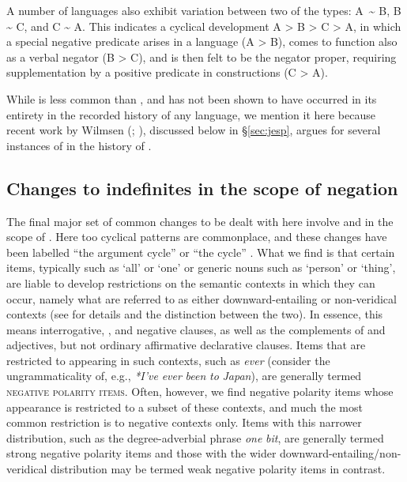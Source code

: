 \documentclass[output=paper]{langsci/langscibook}
\begin{document}
A number of languages also exhibit variation between two of the types: A~{\textasciitilde} B, B {\textasciitilde} C, and C {\textasciitilde} A. This indicates a cyclical development A > B > C > A, in which a special negative  predicate arises in a language (A > B), comes to function also as a verbal negator (B > C), and is then felt to be the negator proper, requiring supplementation by a positive  predicate in  constructions (C > A).

While  is less common than , and has not been shown to have occurred in its entirety in the recorded history of any language, we mention it here because recent work by Wilmsen (\citeyear[174–176]{Wilmsen2014}; \citeyear{Wilmsen2016}), discussed below in §\ref{sec:jesp}, argues for several instances of  in the history of .



\subsection{Changes to indefinites in the scope of negation}\label{sec:ind}\largerpage


The final major set of common changes to be dealt with here involve  and  in the scope of . Here too cyclical patterns are commonplace, and these changes have been labelled “the argument cycle” \citep{Ladusaw1993} or “the  cycle” \citep{Willis2011}. What we find is that certain items, typically  such as ‘all’ or ‘one’ or generic nouns such as ‘person’ or ‘thing’, are liable to develop restrictions on the semantic contexts in which they can occur, namely what are referred to as either downward-entailing or non-veridical contexts (see \citealt{Giannakidou1998} for details and the distinction between the two). In essence, this means interrogative, , and negative clauses, as well as the complements of  and  adjectives, but not ordinary affirmative declarative clauses. Items that are restricted to appearing in such contexts, such as  \textit{ever} (consider the ungrammaticality of, e.g., \textit{*I’ve} \textit{ever} \textit{been} \textit{to} \textit{Japan}), are generally termed \textsc{negative} \textsc{polarity} \textsc{items}. Often, however, we find negative polarity items whose appearance is restricted to a subset of these contexts, and much the most common restriction is to negative contexts only. Items with this narrower distribution, such as the  degree-adverbial phrase \textit{one} \textit{bit}, are generally termed strong negative polarity items and those with the wider downward-entailing/non-veridical distribution may be termed weak negative polarity items in contrast.
\end{document}
